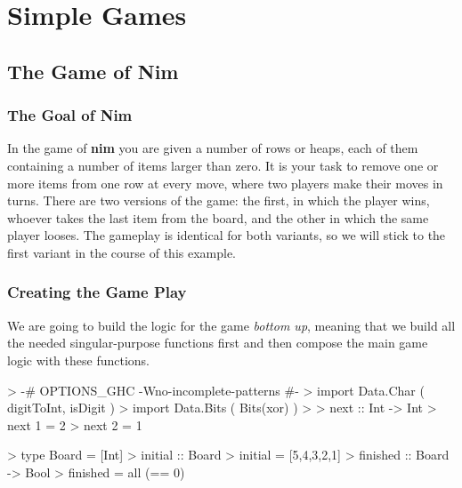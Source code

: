 \chapter{Simple Games}

\section{The Game of Nim}

\subsection{The Goal of Nim}

In the game of \textbf{nim} you are given a number of rows or heaps, each of them containing a number of items larger than zero. 
It is your task to remove one or more items from one row at every move, where two players make their moves in turns.
There are two versions of the game: the first, in which the player wins, whoever takes the last item from the board, and the other in which the same player looses.
The gameplay is identical for both variants, so we will stick to the first variant in the course of this example.

\subsection{Creating the Game Play}

We are going to build the logic for the game \emph{bottom up}, meaning that we build all the needed singular-purpose functions first and then compose the main game logic with these functions.

\begin{impl}
\end{impl}
\begin{haskellcode}

> {-# OPTIONS_GHC -Wno-incomplete-patterns #-}
> import Data.Char ( digitToInt, isDigit )
> import Data.Bits ( Bits(xor) )
> 
> next :: Int -> Int 
> next 1 = 2
> next 2 = 1

\end{haskellcode}

\begin{impl}
\end{impl}
\begin{haskellcode}

> type Board = [Int]
> initial :: Board
> initial = [5,4,3,2,1]
> finished :: Board -> Bool
> finished = all (== 0)

\end{haskellcode}

